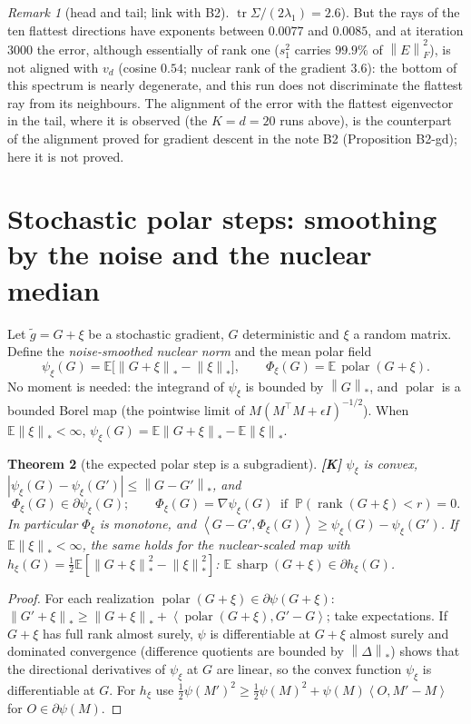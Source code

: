 \documentclass[11pt]{article}
\newtheorem{theorem}{Theorem}[section]
\theoremstyle{definition}
\theoremstyle{remark}
\newtheorem{remark}[theorem]{Remark}
\newcommand{\E}{\mathbb{E}}
\newcommand{\Prob}{\mathbb{P}}
\newcommand{\nnuc}[1]{\left\|#1\right\|_{*}}
\newcommand{\nF}[1]{\left\|#1\right\|_{F}}
\newcommand{\inner}[2]{\left\langle #1, #2 \right\rangle}
\newcommand{\abs}[1]{\left|#1\right|}
\newcommand{\tr}{\operatorname{tr}}
\newcommand{\polar}{\operatorname{polar}}
\newcommand{\sharpop}{\operatorname{sharp}}
\begin{document}
\begin{remark}[head and tail; link with B2]
$\tr\Sigma/(2\lambda_1)=2.6$). But the rays of the ten flattest directions have exponents between $0.0077$ and
$0.0085$, and at iteration $3000$ the error, although essentially of rank one ($s_1^2$ carries $99.9\%$ of
$\nF E^2$), is not aligned with $v_d$ (cosine $0.54$; nuclear rank of the gradient $3.6$): the bottom of this spectrum
is nearly degenerate, and this run does not discriminate the flattest ray from its neighbours. The alignment of the
error with the flattest eigenvector in the tail, where it is observed (the $K=d=20$ runs above), is the counterpart of
the alignment proved for gradient descent in the note B2 (Proposition B2-gd); here it is not proved.
\end{remark}

\section{Stochastic polar steps: smoothing by the noise and the nuclear median}\label{sec:noise}

Let $\tilde g=G+\xi$ be a stochastic gradient, $G$ deterministic and $\xi$ a random matrix. Define the
\emph{noise-smoothed nuclear norm} and the mean polar field
\[
\psi_\xi(G)=\E\big[\nnuc{G+\xi}-\nnuc\xi\big],\qquad \Phi_\xi(G)=\E\,\polar(G+\xi).
\]
No moment is needed: the integrand of $\psi_\xi$ is bounded by $\nnuc G$, and $\polar$ is a bounded Borel map (the
pointwise limit of $M(M^\top M+\epsilon I)^{-1/2}$). When $\E\nnuc\xi<\infty$, $\psi_\xi(G)=\E\nnuc{G+\xi}-\E\nnuc\xi$.

\begin{theorem}[the expected polar step is a subgradient]\label{thm:smooth} \textbf{[K]}
$\psi_\xi$ is convex, $\abs{\psi_\xi(G)-\psi_\xi(G')}\le\nnuc{G-G'}$, and
\[
\Phi_\xi(G)\in\partial\psi_\xi(G);\qquad \Phi_\xi(G)=\nabla\psi_\xi(G)\ \text{ if }\ \Prob(\operatorname{rank}(G+\xi)<r)=0 .
\]
In particular $\Phi_\xi$ is monotone, and $\inner{G-G'}{\Phi_\xi(G)}\ge\psi_\xi(G)-\psi_\xi(G')$. If $\E\nnuc\xi<\infty$, the
same holds for the nuclear-scaled map with $h_\xi(G)=\frac12\E[\nnuc{G+\xi}^2-\nnuc\xi^2]$:
$\E\,\sharpop(G+\xi)\in\partial h_\xi(G)$.
\end{theorem}
\begin{proof}
For each realization $\polar(G+\xi)\in\partial\psi(G+\xi)$:
$\nnuc{G'+\xi}\ge\nnuc{G+\xi}+\inner{\polar(G+\xi)}{G'-G}$; take expectations. If $G+\xi$ has full rank almost surely,
$\psi$ is differentiable at $G+\xi$ almost surely and dominated convergence (difference quotients are bounded by
$\nnuc{\Delta}$) shows that the directional derivatives of $\psi_\xi$ at $G$ are linear, so the convex function
$\psi_\xi$ is differentiable at $G$. For $h_\xi$ use
$\frac12\psi(M')^2\ge\frac12\psi(M)^2+\psi(M)\inner O{M'-M}$ for $O\in\partial\psi(M)$.
\end{proof}
\end{document}
